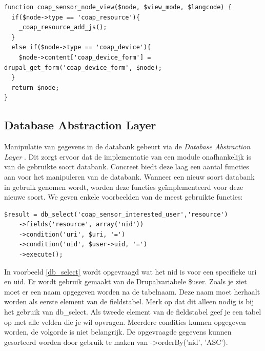 \scriptsize
\lstset{language=PHP}
\begin{lstlisting}[label=lst:drupalHookExample,caption=Implementatie van hook\_node\_view door de module coap\_sensor]
function coap_sensor_node_view($node, $view_mode, $langcode) {
  if($node->type == 'coap_resource'){
    _coap_resource_add_js();
  }
  else if($node->type == 'coap_device'){
    $node->content['coap_device_form'] = drupal_get_form('coap_device_form', $node);
  }
  return $node;
}
\end{lstlisting}
\normalsize

\subsection{Database Abstraction Layer}\label{databaseAbstractionLayer}
Manipulatie van gegevens in de databank gebeurt via de \textit{Database Abstraction Layer} \cite{databaseAbstractionLayer}. Dit zorgt ervoor dat de implementatie van een module onafhankelijk is van de gebruikte soort databank. Concreet biedt deze laag een aantal functies aan voor het manipuleren van de databank. Wanneer een nieuw soort databank in gebruik genomen wordt, worden deze functies ge\"{i}mplementeerd voor deze nieuwe soort. We geven enkele voorbeelden van de meest gebruikte functies:
\lstset{language=PHP}
\begin{lstlisting}[label=db_select,caption=Voorbeeld gebruik van db\_select]
$result = db_select('coap_sensor_interested_user','resource')
	->fields('resource', array('nid'))
	->condition('uri', $uri, '=')
	->condition('uid', $user->uid, '=')
	->execute();
\end{lstlisting}
In voorbeeld \ref{db_select} wordt opgevraagd wat het nid is voor een specifieke uri en uid. Er wordt gebruik gemaakt van de Drupalvariabele \$user. Zoals je ziet moet er een naam opgegeven worden na de tabelnaam. Deze naam moet herhaalt worden als eerste element van de fieldstabel. Merk op dat dit alleen nodig is bij het gebruik van db\_select. Als tweede element van de fieldstabel geef je een tabel op met alle velden die je wil opvragen. Meerdere condities kunnen opgegeven worden, de volgorde is niet belangrijk. De opgevraagde gegevens kunnen gesorteerd worden door gebruik te maken van -\textgreater orderBy('nid', 'ASC').\\


